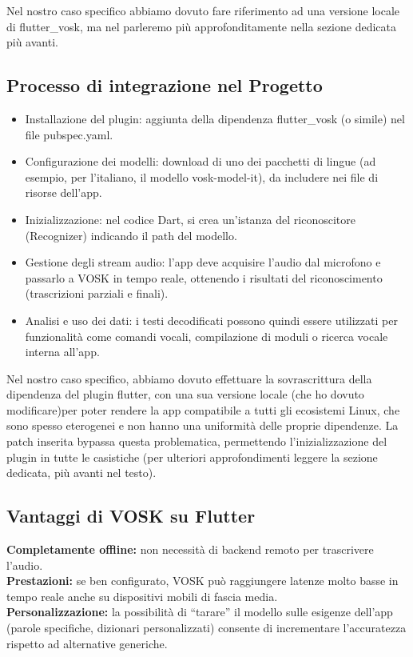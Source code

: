 \documentclass[14pt]{extbook}
\begin{document}
Nel nostro caso specifico abbiamo dovuto fare riferimento ad una versione locale di flutter\_vosk, ma nel parleremo più approfonditamente nella sezione dedicata più avanti.\\
\subsection{Processo di integrazione nel Progetto}
\begin{itemize}
\item{Installazione del plugin:} aggiunta della dipendenza flutter\_vosk (o simile) nel file pubspec.yaml.
\item{Configurazione dei modelli:} download di uno dei pacchetti di lingue (ad esempio, per l’italiano, il modello vosk-model-it), da includere nei file di risorse dell’app.
\item{Inizializzazione:} nel codice Dart, si crea un’istanza del riconoscitore (Recognizer) indicando il path del modello.
\item{Gestione degli stream audio:} l’app deve acquisire l’audio dal microfono e passarlo a VOSK in tempo reale, ottenendo i risultati del riconoscimento (trascrizioni parziali e finali).
\item{Analisi e uso dei dati:} i testi decodificati possono quindi essere utilizzati per funzionalità come comandi vocali, compilazione di moduli o ricerca vocale interna all’app.
\end{itemize}

Nel nostro caso specifico, abbiamo dovuto effettuare la sovrascrittura della dipendenza del plugin flutter, con una sua versione locale (che ho dovuto modificare)per poter rendere la app compatibile a tutti gli ecosistemi Linux, che sono spesso eterogenei e non hanno una uniformità delle proprie dipendenze. La patch inserita bypassa questa problematica, permettendo l'inizializzazione del plugin in tutte le casistiche (per ulteriori approfondimenti leggere la sezione dedicata, più avanti nel testo).\\

\subsection{Vantaggi di VOSK su Flutter}
\textbf{Completamente offline:} non necessità di backend remoto per trascrivere l’audio.\\
\textbf{Prestazioni:} se ben configurato, VOSK può raggiungere latenze molto basse in tempo reale anche su dispositivi mobili di fascia media.\\
\textbf{Personalizzazione:} la possibilità di “tarare” il modello sulle esigenze dell’app (parole specifiche, dizionari personalizzati) consente di incrementare l’accuratezza rispetto ad alternative generiche.\\
\end{document}
